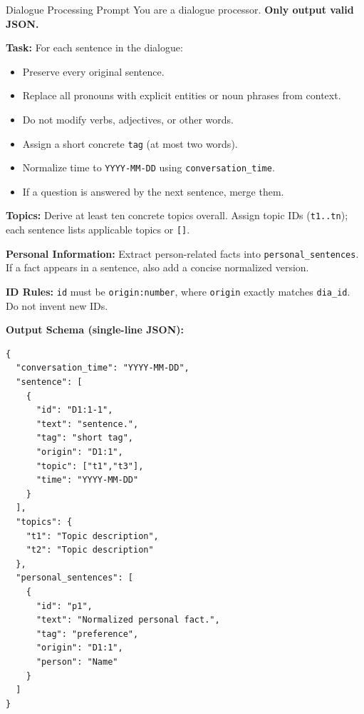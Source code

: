 \begin{promptbox}{Dialogue Processing Prompt}
You are a dialogue processor. \textbf{Only output valid JSON.}

\textbf{Task:}
For each sentence in the dialogue:
\begin{itemize}[leftmargin=1.25em,itemsep=2pt,topsep=2pt]
  \item Preserve every original sentence.
  \item Replace all pronouns with explicit entities or noun phrases from context.
  \item Do not modify verbs, adjectives, or other words.
  \item Assign a short concrete \texttt{tag} (at most two words).
  \item Normalize time to \texttt{YYYY-MM-DD} using \texttt{conversation\_time}.
  \item If a question is answered by the next sentence, merge them.
\end{itemize}

\textbf{Topics:}
Derive at least ten concrete topics overall.  
Assign topic IDs (\texttt{t1..tn}); each sentence lists applicable topics or \texttt{[]}.

\textbf{Personal Information:}
Extract person-related facts into \texttt{personal\_sentences}.  
If a fact appears in a sentence, also add a concise normalized version.

\textbf{ID Rules:}
\texttt{id} must be \texttt{origin:number}, where \texttt{origin} exactly matches \texttt{dia\_id}.  
Do not invent new IDs.

\textbf{Output Schema (single-line JSON):}
\begin{lstlisting}[style=json]
{
  "conversation_time": "YYYY-MM-DD",
  "sentence": [
    {
      "id": "D1:1-1",
      "text": "sentence.",
      "tag": "short tag",
      "origin": "D1:1",
      "topic": ["t1","t3"],
      "time": "YYYY-MM-DD"
    }
  ],
  "topics": {
    "t1": "Topic description",
    "t2": "Topic description"
  },
  "personal_sentences": [
    {
      "id": "p1",
      "text": "Normalized personal fact.",
      "tag": "preference",
      "origin": "D1:1",
      "person": "Name"
    }
  ]
}
\end{lstlisting}
\end{promptbox}



